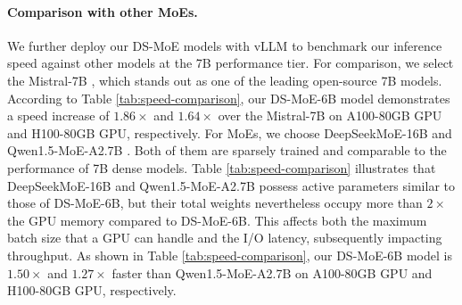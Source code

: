 \paragraph{Comparison with other MoEs.} We further deploy our DS-MoE models with vLLM \cite{kwon2023efficient} to benchmark our inference speed against other models at the 7B performance tier. For comparison, we select the Mistral-7B \cite{jiang2023mistral}, which stands out as one of the leading open-source 7B models. According to Table \ref{tab:speed-comparison}, our DS-MoE-6B model demonstrates a speed increase of $1.86\times$ and $1.64\times$ over the Mistral-7B on A100-80GB GPU and H100-80GB GPU, respectively. For MoEs, we choose DeepSeekMoE-16B \cite{dai2024deepseekmoe} and Qwen1.5-MoE-A2.7B \cite{qwen}. Both of them are sparsely trained and comparable to the performance of 7B dense models. Table \ref{tab:speed-comparison} illustrates that DeepSeekMoE-16B and Qwen1.5-MoE-A2.7B possess active parameters similar to those of DS-MoE-6B, but their total weights nevertheless occupy more than $2\times$ the GPU memory compared to DS-MoE-6B. This affects both the maximum batch size that a GPU can handle and the I/O latency, subsequently impacting throughput. As shown in Table \ref{tab:speed-comparison}, our DS-MoE-6B model is $1.50\times$ and $1.27\times$ faster than Qwen1.5-MoE-A2.7B on A100-80GB GPU and H100-80GB GPU, respectively.
